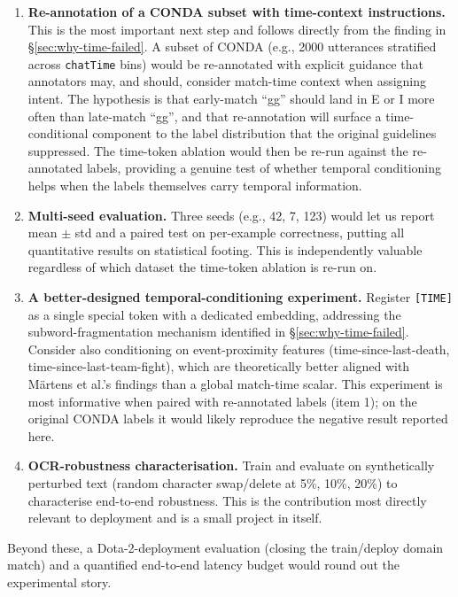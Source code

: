 \documentclass[a4paper,10.5pt,twoside]{article}
\begin{document}
\begin{enumerate}
    \item \textbf{Re-annotation of a CONDA subset with time-context instructions.} This is the most important next step and follows directly from the finding in \S\ref{sec:why-time-failed}. A subset of CONDA (e.g., 2000 utterances stratified across \texttt{chatTime} bins) would be re-annotated with explicit guidance that annotators may, and should, consider match-time context when assigning intent. The hypothesis is that early-match ``gg'' should land in E or I more often than late-match ``gg'', and that re-annotation will surface a time-conditional component to the label distribution that the original guidelines suppressed. The time-token ablation would then be re-run against the re-annotated labels, providing a genuine test of whether temporal conditioning helps when the labels themselves carry temporal information.

    \item \textbf{Multi-seed evaluation.} Three seeds (e.g., 42, 7, 123) would let us report mean $\pm$ std and a paired test on per-example correctness, putting all quantitative results on statistical footing. This is independently valuable regardless of which dataset the time-token ablation is re-run on.

    \item \textbf{A better-designed temporal-conditioning experiment.} Register \texttt{[TIME]} as a single special token with a dedicated embedding, addressing the subword-fragmentation mechanism identified in \S\ref{sec:why-time-failed}. Consider also conditioning on event-proximity features (time-since-last-death, time-since-last-team-fight), which are theoretically better aligned with M\"artens et al.'s findings than a global match-time scalar. This experiment is most informative when paired with re-annotated labels (item 1); on the original CONDA labels it would likely reproduce the negative result reported here.

    \item \textbf{OCR-robustness characterisation.} Train and evaluate on synthetically perturbed text (random character swap/delete at 5\%, 10\%, 20\%) to characterise end-to-end robustness. This is the contribution most directly relevant to deployment and is a small project in itself.
\end{enumerate}

Beyond these, a Dota-2-deployment evaluation (closing the train/deploy domain match) and a quantified end-to-end latency budget would round out the experimental story.
\end{document}
